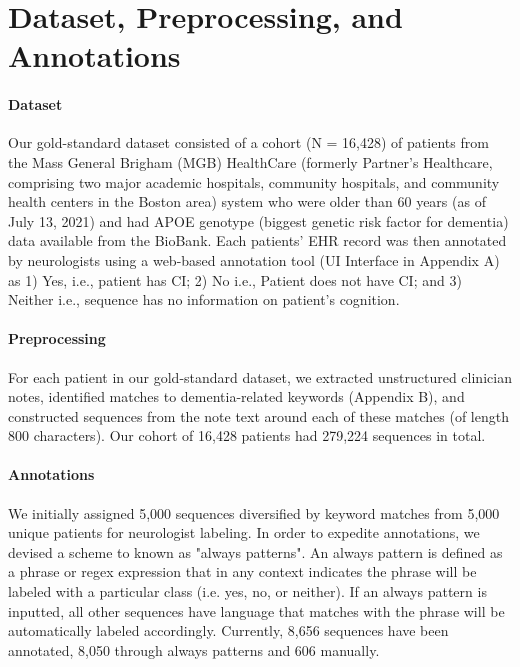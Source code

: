 \documentclass[pmlr,twocolumn,10pt]{jmlr} %
\begin{document}
\section{Dataset, Preprocessing, and Annotations}
\label{sec:Dataset+Preprocessing+Annotations}

\paragraph{Dataset}
\label{sec:Dataset} Our gold-standard dataset consisted of a cohort (N = 16,428) of patients from the Mass General Brigham (MGB) HealthCare (formerly Partner's Healthcare, comprising two major academic hospitals, community hospitals, and community health centers in the Boston area) system who were older than 60 years (as of July 13, 2021) and had APOE genotype (biggest genetic risk factor for dementia) data available from the BioBank. Each patients' EHR record was then annotated by neurologists using a web-based annotation tool (UI Interface in Appendix A) as 1) Yes, i.e., patient has CI; 2) No i.e., Patient does not have CI; and 3) Neither i.e., sequence has no information on patient’s cognition.

\paragraph{Preprocessing}
\label{sec:Preprocessing} For each patient in our gold-standard dataset, we extracted unstructured clinician notes, identified matches to dementia-related keywords (Appendix B), and constructed sequences from the note text around each of these matches (of length 800 characters). Our cohort of 16,428 patients had 279,224 sequences in total. 

\paragraph{Annotations}
\label{sec:Annotations} We initially assigned 5,000 sequences diversified by keyword matches from 5,000 unique patients for neurologist labeling. In order to expedite annotations, we devised a scheme to known as "always patterns". An always pattern is defined as a phrase or regex expression that in any context indicates the phrase will be labeled with a particular class (i.e. yes, no, or neither). If an always pattern is inputted, all other sequences have language that matches with the phrase will be automatically labeled accordingly. Currently, 8,656 sequences have been annotated, 8,050 through always patterns and 606 manually. %
\end{document}

